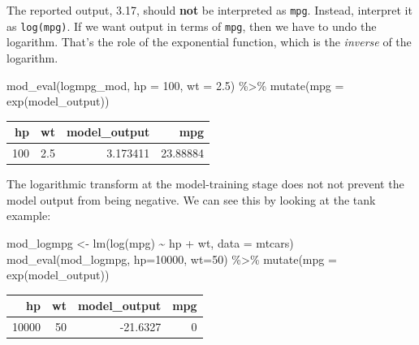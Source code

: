 \documentclass[
  letterpaper,
  DIV=11,
  numbers=noendperiod,
  oneside]{scrreprt}
\newenvironment{Shaded}{\begin{snugshade}}{\end{snugshade}}
\newcommand{\AttributeTok}[1]{\textcolor[rgb]{0.40,0.45,0.13}{#1}}
\newcommand{\DecValTok}[1]{\textcolor[rgb]{0.68,0.00,0.00}{#1}}
\newcommand{\FloatTok}[1]{\textcolor[rgb]{0.68,0.00,0.00}{#1}}
\newcommand{\FunctionTok}[1]{\textcolor[rgb]{0.28,0.35,0.67}{#1}}
\newcommand{\NormalTok}[1]{\textcolor[rgb]{0.00,0.23,0.31}{#1}}
\newcommand{\OtherTok}[1]{\textcolor[rgb]{0.00,0.23,0.31}{#1}}
\newcommand{\SpecialCharTok}[1]{\textcolor[rgb]{0.37,0.37,0.37}{#1}}
\begin{document}
{\begin{footnotesize}
The reported output, 3.17, should \textbf{not} be interpreted as
\texttt{mpg}. Instead, interpret it as \texttt{log(mpg)}. If we want
output in terms of \texttt{mpg}, then we have to undo the logarithm.
That's the role of the exponential function, which is the \emph{inverse}
of the logarithm.

\begin{Shaded}
\begin{Highlighting}[]
\FunctionTok{mod\_eval}\NormalTok{(logmpg\_mod, }\AttributeTok{hp =} \DecValTok{100}\NormalTok{, }\AttributeTok{wt =} \FloatTok{2.5}\NormalTok{) }\SpecialCharTok{\%\textgreater{}\%}
  \FunctionTok{mutate}\NormalTok{(}\AttributeTok{mpg =} \FunctionTok{exp}\NormalTok{(model\_output))}
\end{Highlighting}
\end{Shaded}

\ttfamily 
\begin{tabular}{rrrr}
\toprule
hp & wt & model\_output & mpg\\
\midrule
100 & 2.5 & 3.173411 & 23.88884\\
\bottomrule
\end{tabular} \normalfont
\bigskip

The logarithmic transform at the model-training stage does not not
prevent the model output from being negative. We can see this by looking
at the tank example:

\begin{Shaded}
\begin{Highlighting}[]
\NormalTok{mod\_logmpg }\OtherTok{\textless{}{-}} \FunctionTok{lm}\NormalTok{(}\FunctionTok{log}\NormalTok{(mpg) }\SpecialCharTok{\textasciitilde{}}\NormalTok{ hp }\SpecialCharTok{+}\NormalTok{ wt, }\AttributeTok{data =}\NormalTok{ mtcars)}
\FunctionTok{mod\_eval}\NormalTok{(mod\_logmpg, }\AttributeTok{hp=}\DecValTok{10000}\NormalTok{, }\AttributeTok{wt=}\DecValTok{50}\NormalTok{) }\SpecialCharTok{\%\textgreater{}\%}
  \FunctionTok{mutate}\NormalTok{(}\AttributeTok{mpg =} \FunctionTok{exp}\NormalTok{(model\_output))}
\end{Highlighting}
\end{Shaded}

\ttfamily 
\begin{tabular}{rrrr}
\toprule
hp & wt & model\_output & mpg\\
\midrule
10000 & 50 & -21.6327 & 0\\
\bottomrule
\end{tabular} \normalfont
\bigskip


\end{footnotesize}}
\end{document}
